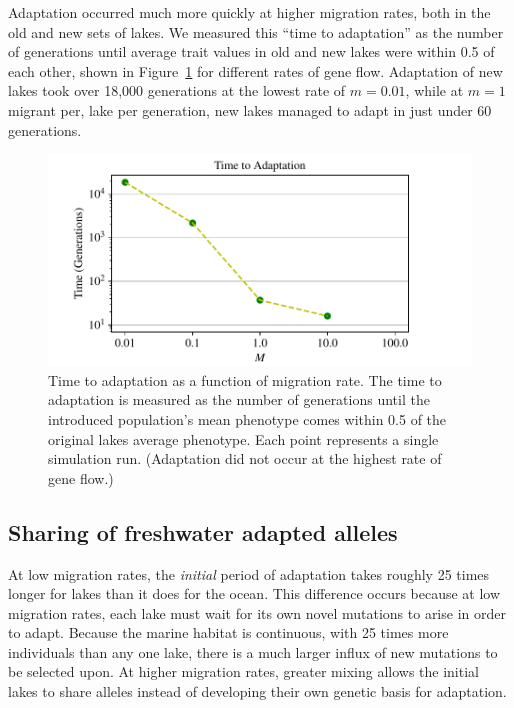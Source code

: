 \documentclass{article}
\begin{document}
Adaptation occurred much more quickly at higher migration rates, both in the old and new sets of lakes. We measured this ``time to adaptation'' as the number of generations until average trait values in old and new lakes were within 0.5 of each other, shown in Figure~\ref{fig:TimeToAdaptation} for different rates of gene flow. Adaptation of new lakes took over 18,000 generations at the lowest rate of $m = 0.01$, while at $m = 1$ migrant per, lake per generation, new lakes managed to adapt in just under 60 generations. 

\begin{figure}
    \begin{center}
          \includegraphics{Final_Plots/Time_Adapt.pdf}
          \caption{
            Time to adaptation as a function of migration rate.
            The time to adaptation is measured as the number of generations until
            the introduced population's mean phenotype 
            comes within 0.5 of the original lakes average phenotype. 
            Each point represents a single simulation run.
            (Adaptation did not occur at the highest rate of gene flow.)
        } \label{fig:TimeToAdaptation}
    \end{center}
\end{figure}



\subsection*{Sharing of freshwater adapted alleles}

At low migration rates, the \emph{initial} period of adaptation takes roughly 25 times longer for lakes than it does for the ocean. This difference occurs because at low migration rates, each lake must wait for its own novel mutations to arise in order to adapt. Because the marine habitat is continuous, with 25 times more individuals than any one lake, there is a much larger influx of new mutations to be selected upon. At higher migration rates, greater mixing allows the initial lakes to share alleles instead of developing their own genetic basis for adaptation. 
\end{document}
